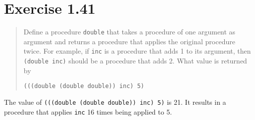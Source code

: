 \documentclass{article}
\begin{document}


\section{Exercise 1.41}
\begin{quote}
    Define a procedure \texttt{double} that takes a procedure of one argument
    as argument and returns a procedure that applies the original procedure
    twice. For example, if \texttt{inc} is a procedure that adds 1 to its
    argument, then \texttt{(double inc)} should be a procedure that adds 2.
    What value is returned by
    \begin{lstlisting}
(((double (double double)) inc) 5)
    \end{lstlisting}
\end{quote}



The value of \texttt{(((double (double double)) inc) 5)} is 21. It results in
a procedure that applies \texttt{inc} 16 times being applied to 5.
\end{document}
